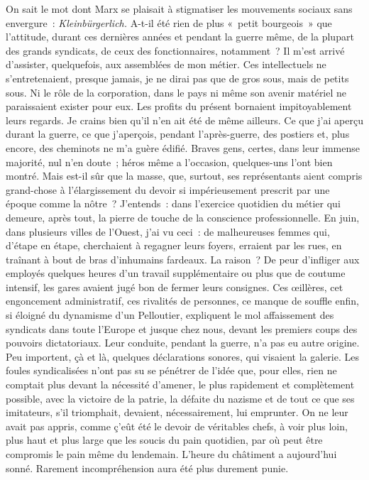 \documentclass[french,twoside]{book} %
\begin{document}
On sait le mot dont Marx se plaisait à stigmatiser les mouvements sociaux sans envergure : {\itshape Kleinbürgerlich.} A-t-il été rien de plus « petit bourgeois » que l’attitude, durant ces dernières années et pendant la guerre même, de la plupart des grands syndicats, de ceux des fonctionnaires, notamment ? Il m’est arrivé d’assister, quelquefois, aux assemblées de mon métier. Ces intellectuels ne s’entretenaient, presque jamais, je ne dirai pas que de gros sous, mais de petits sous. Ni le rôle de la corporation, dans le pays ni même son avenir matériel ne paraissaient exister pour eux. Les profits du présent bornaient impitoyablement leurs regards. Je crains bien qu’il n’en ait été de même ailleurs. Ce que j’ai aperçu durant la guerre, ce que j’aperçois, pendant l’après-guerre, des postiers et, plus encore, des cheminots ne m’a guère édifié. Braves gens, certes, dans leur immense majorité, nul n’en doute ; héros même a l’occasion, quelques-uns l’ont bien montré. Mais est-il sûr que la masse, que, surtout, ses représentants aient compris grand-chose à l’élargissement du devoir si impérieusement prescrit par une époque comme la nôtre ? J’entends : dans l’exercice quotidien du métier qui demeure, après tout, la pierre de touche de la conscience professionnelle. En juin, dans plusieurs villes de l’Ouest, j’ai vu ceci : de   malheureuses femmes qui, d’étape en étape, cherchaient à regagner leurs foyers, erraient par les rues, en traînant à bout de bras d’inhumains fardeaux. La raison ? De peur d’infliger aux employés quelques heures d’un travail supplémentaire ou plus que de coutume intensif, les gares avaient jugé bon de fermer leurs consignes. Ces œillères, cet engoncement administratif, ces rivalités de personnes, ce manque de souffle enfin, si éloigné du dynamisme d’un Pelloutier, expliquent le mol affaissement des syndicats dans toute l’Europe et jusque chez nous, devant les premiers coups des pouvoirs dictatoriaux. Leur conduite, pendant la guerre, n’a pas eu autre origine. Peu importent, çà et là, quelques déclarations sonores, qui visaient la galerie. Les foules syndicalisées n’ont pas su se pénétrer de l’idée que, pour elles, rien ne comptait plus devant la nécessité d’amener, le plus rapidement et complètement possible, avec la victoire de la patrie, la défaite du nazisme et de tout ce que ses imitateurs, s’il triomphait, devaient, nécessairement, lui emprunter. On ne leur avait pas appris, comme ç’eût été le devoir de véritables chefs, à voir plus loin, plus haut et plus large que les soucis du pain quotidien, par où peut être compromis le pain même du lendemain. L’heure du châtiment a aujourd’hui sonné. Rarement incompréhension aura été plus durement punie.\par
\end{document}
